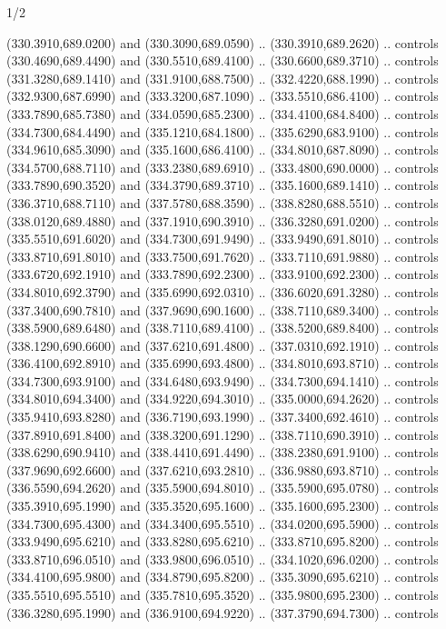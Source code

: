\begin{flagdescription}{1/2}
\begin{scope}[xshift=0.5\flaglength]
\begin{scope}[scale=0.00745\flagwidth,xshift=-12.1mm,yshift=41.7mm]
\begin{scope}[y=0.80pt, x=0.80pt, yscale=-1, xscale=1, inner sep=0pt, outer sep=0pt]
\begin{scope}[cm={{1.33333,0.0,0.0,-1.33333,(0.0,114.66667)}}]
\begin{scope}[scale=0.100]
  (330.3910,689.0200) and (330.3090,689.0590) .. (330.3910,689.2620) .. controls
  (330.4690,689.4490) and (330.5510,689.4100) .. (330.6600,689.3710) .. controls
  (331.3280,689.1410) and (331.9100,688.7500) .. (332.4220,688.1990) .. controls
  (332.9300,687.6990) and (333.3200,687.1090) .. (333.5510,686.4100) .. controls
  (333.7890,685.7380) and (334.0590,685.2300) .. (334.4100,684.8400) .. controls
  (334.7300,684.4490) and (335.1210,684.1800) .. (335.6290,683.9100) .. controls
  (334.9610,685.3090) and (335.1600,686.4100) .. (334.8010,687.8090) .. controls
  (334.5700,688.7110) and (333.2380,689.6910) .. (333.4800,690.0000) .. controls
  (333.7890,690.3520) and (334.3790,689.3710) .. (335.1600,689.1410) .. controls
  (336.3710,688.7110) and (337.5780,688.3590) .. (338.8280,688.5510) .. controls
  (338.0120,689.4880) and (337.1910,690.3910) .. (336.3280,691.0200) .. controls
  (335.5510,691.6020) and (334.7300,691.9490) .. (333.9490,691.8010) .. controls
  (333.8710,691.8010) and (333.7500,691.7620) .. (333.7110,691.9880) .. controls
  (333.6720,692.1910) and (333.7890,692.2300) .. (333.9100,692.2300) .. controls
  (334.8010,692.3790) and (335.6990,692.0310) .. (336.6020,691.3280) .. controls
  (337.3400,690.7810) and (337.9690,690.1600) .. (338.7110,689.3400) .. controls
  (338.5900,689.6480) and (338.7110,689.4100) .. (338.5200,689.8400) .. controls
  (338.1290,690.6600) and (337.6210,691.4800) .. (337.0310,692.1910) .. controls
  (336.4100,692.8910) and (335.6990,693.4800) .. (334.8010,693.8710) .. controls
  (334.7300,693.9100) and (334.6480,693.9490) .. (334.7300,694.1410) .. controls
  (334.8010,694.3400) and (334.9220,694.3010) .. (335.0000,694.2620) .. controls
  (335.9410,693.8280) and (336.7190,693.1990) .. (337.3400,692.4610) .. controls
  (337.8910,691.8400) and (338.3200,691.1290) .. (338.7110,690.3910) .. controls
  (338.6290,690.9410) and (338.4410,691.4490) .. (338.2380,691.9100) .. controls
  (337.9690,692.6600) and (337.6210,693.2810) .. (336.9880,693.8710) .. controls
  (336.5590,694.2620) and (335.5900,694.8010) .. (335.5900,695.0780) .. controls
  (335.3910,695.1990) and (335.3520,695.1600) .. (335.1600,695.2300) .. controls
  (334.7300,695.4300) and (334.3400,695.5510) .. (334.0200,695.5900) .. controls
  (333.9490,695.6210) and (333.8280,695.6210) .. (333.8710,695.8200) .. controls
  (333.8710,696.0510) and (333.9800,696.0510) .. (334.1020,696.0200) .. controls
  (334.4100,695.9800) and (334.8790,695.8200) .. (335.3090,695.6210) .. controls
  (335.5510,695.5510) and (335.7810,695.3520) .. (335.9800,695.2300) .. controls
  (336.3280,695.1990) and (336.9100,694.9220) .. (337.3790,694.7300) .. controls

\end{scope}
\end{scope}
\end{scope}
\end{scope}
\end{scope}
\end{flagdescription}

